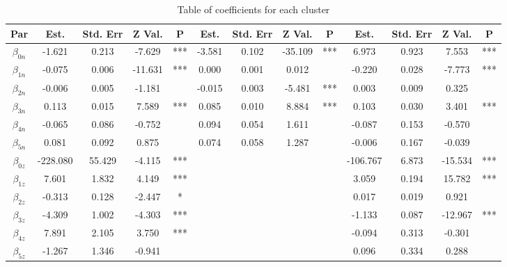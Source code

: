 \documentclass[11pt,letterpaper]{article}
\numberwithin{equation}{section}
\numberwithin{equation}{section}
\numberwithin{equation}{section}
\begin{document}
\begin{center}
\begin{flushleft}
\begin{small}
\begin{table}[h!]
\begin{adjustwidth}{-0.5cm}{}
\caption{Table of coefficients for each cluster }%
\label{table:freqCoef}
\hspace*{-1cm}\begin{tabular}{|ccccc|cccc|cccc|}
\hline\hline
Par & Est. & Std. Err & Z Val.& P & Est.  & Std. Err & Z Val. & P & Est.  & Std. Err & Z Val. & P \\
\hline
$\beta_{0n}$       & -1.621   & 0.213      & -7.629  & ***   &-3.581	& 0.102	& -35.109	& ***   & 6.973    & 0.923      & 7.553   & ***   \\
$\beta_{1n}$      & -0.075   & 0.006      & -11.631 & ***   & 0.000    & 0.001      & 0.012   &       & -0.220   & 0.028      & -7.773  & ***   \\
$\beta_{2n}$      & -0.006   & 0.005      & -1.181  &       & -0.015	& 0.003	& -5.481 & 	***   & 0.003    & 0.009      & 0.325   &       \\
$\beta_{3n}$       & 0.113    & 0.015      & 7.589   & ***   &0.085 & 	0.010 & 	8.884	& ***  & 0.103    & 0.030      & 3.401   & ***   \\
$\beta_{4n}$   & -0.065   & 0.086      & -0.752  &       & 0.094    & 0.054      & 1.611  &    & -0.087   & 0.153      & -0.570  &       \\
$\beta_{5n}$   & 0.081    & 0.092      & 0.875   &       & 0.074    & 0.058      & 1.287   &       & -0.006   & 0.167      & -0.039  &       \\
$\beta_{0z}$   & -228.080 & 55.429     & -4.115  & ***   & &     &    &      & -106.767 & 6.873      & -15.534 & ***   \\
$\beta_{1z}$  & 7.601    & 1.832      & 4.149   & ***   &  &       & &       &3.059   &  0.194    & 15.782   & ***   \\
$\beta_{2z}$    & -0.313   & 0.128      & -2.447  & *     &   &     &   &  & 0.017    & 0.019      & 0.921   &       \\
$\beta_{3z}$  & -4.309   & 1.002      & -4.303  & ***   &   &     &   &     & -1.133   & 0.087      & -12.967 & ***   \\
$\beta_{4z}$ & 7.891    & 2.105      & 3.750   & ***   &    &      &   &       & -0.094   & 0.313      & -0.301  &       \\
$\beta_{5z}$     & -1.267   & 1.346      & -0.941  &       &    &    &  &       & 0.096    & 0.334      & 0.288   &   \\
\hline\hline
\end{tabular}\hspace*{-1cm}
\end{adjustwidth}
\end{table}
\end{small}
\end{flushleft}
\end{center}
\end{document}

